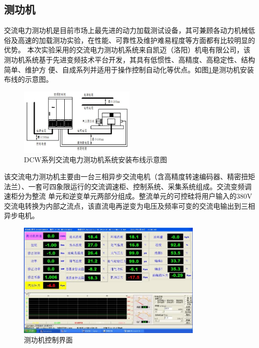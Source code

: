 \subsection{测功机}
交流电力测功机是目前市场上最先进的动力加载测试设备，其可兼顾各动力机械低俗及高速的加载测功实验，在性能、可靠性及维护难易程度等方面都有比较明显的优势。
本次实验采用的交流电力测功机系统来自凯迈（洛阳）机电有限公司，该测功机系统基于先进变频技术平台开发，其具有低惯性、高精度、高稳定性、结构简单、维护方
便、自成系列并适用于操作控制自动化等优点。如图\ref{fig:dlcgj}是测功机安装布线的示意图。
\begin{figure}[H]
	\centering
	\includegraphics[width=0.5\textwidth]{thesis_figure/platformer_chapter/dlcgj}
	\caption{DCW系列交流电力测功机系统安装布线示意图}
	\label{fig:dlcgj}
\end{figure}
\par 该交流电力测功机主要由一台三相异步交流电机（含高精度转速编码器、精密扭矩法兰）、一套可四象限运行的交流调速柜、控制系统、采集系统组成。交流变频调速柜分为整流
单元和逆变单元两部分组成。整流单元的可控硅将用户输入的380V交流电转换为内部之流点，该直流电再逆变为电压及频率可变的交流电输出到三相异步电机。
\begin{figure}[H]
	\centering
	\includegraphics[width=0.8\textwidth]{thesis_figure/platformer_chapter/cgjkzjm}
	\caption{测功机控制界面}
	\label{fig:cgjkzjm}
\end{figure}

